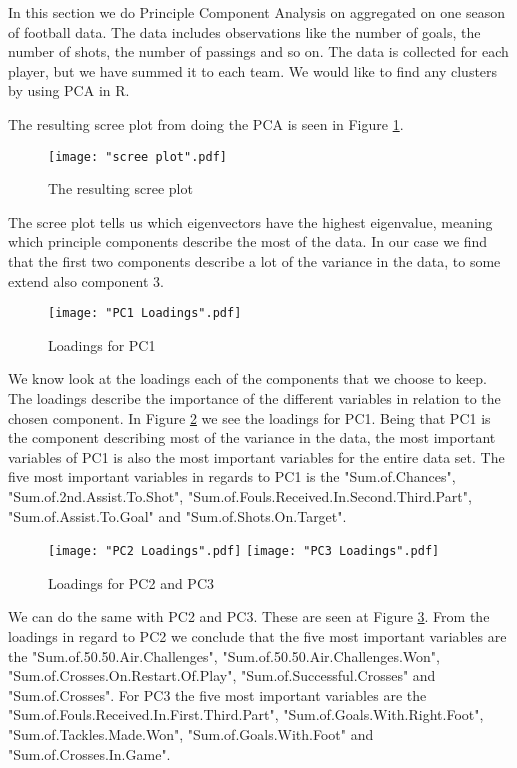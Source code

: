 \documentclass[Report.tex]{subfiles}
\begin{document}
In this section we do Principle Component Analysis on aggregated on one season of football data. The data includes observations like the number of goals, the number of shots, the number of passings and so on. The data is collected for each player, but we have summed it to each team. We would like to find any clusters by using PCA in R.

The resulting scree plot from doing the PCA is seen in Figure \ref{fig:scree}.
\begin{figure}
\center
\texttt{[image: "scree plot".pdf]}
\caption{The resulting scree plot}
\label{fig:scree}
\end{figure}
The scree plot tells us which eigenvectors have the highest eigenvalue, meaning which principle components describe the most of the data. In our case we find that the first two components describe a lot of the variance in the data, to some extend also component 3. 

\begin{figure}
\center
\texttt{[image: "PC1 Loadings".pdf]}
\caption{Loadings for PC1}
\label{fig:PC1Loadings}
\end{figure}
We know look at the loadings each of the components that we choose to keep. The loadings describe the importance of the different variables in relation to the chosen component. In Figure \ref{fig:PC1Loadings} we see the loadings for PC1. Being that PC1 is the component describing most of the variance in the data, the most important variables of PC1 is also the most important variables for the entire data set. The five most important variables in regards to PC1 is the "Sum.of.Chances", "Sum.of.2nd.Assist.To.Shot", "Sum.of.Fouls.Received.In.Second.Third.Part", "Sum.of.Assist.To.Goal" and "Sum.of.Shots.On.Target".

\begin{figure}
\center
\texttt{[image: "PC2 Loadings".pdf]}
\texttt{[image: "PC3 Loadings".pdf]}
\caption{Loadings for PC2 and PC3}
\label{fig:PC23Loadings}
\end{figure}

We can do the same with PC2 and PC3. These are seen at Figure \ref{fig:PC23Loadings}. From the loadings in regard to PC2 we conclude that the five most important variables are the "Sum.of.50.50.Air.Challenges", "Sum.of.50.50.Air.Challenges.Won", "Sum.of.Crosses.On.Restart.Of.Play", "Sum.of.Successful.Crosses" and "Sum.of.Crosses".
For PC3 the five most important variables are the "Sum.of.Fouls.Received.In.First.Third.Part", "Sum.of.Goals.With.Right.Foot", "Sum.of.Tackles.Made.Won", "Sum.of.Goals.With.Foot" and "Sum.of.Crosses.In.Game".
\end{document}
